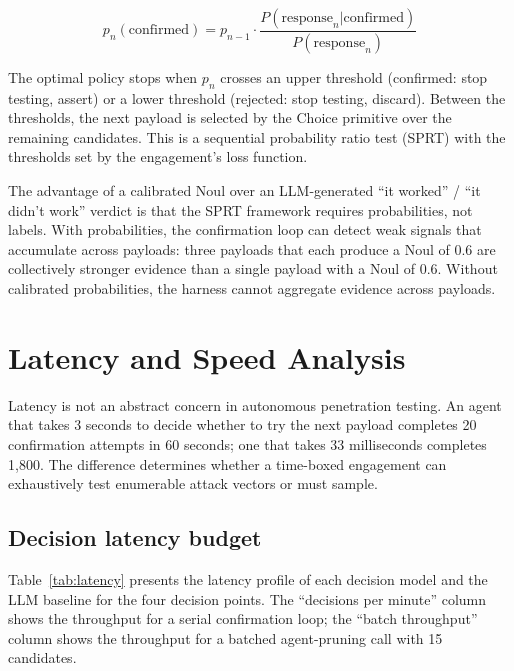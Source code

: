 \documentclass[conference]{IEEEtran}
\begin{document}
\begin{equation}
p_n(\text{confirmed}) = p_{n-1} \cdot \frac{P(\text{response}_n | \text{confirmed})}{P(\text{response}_n)}
\end{equation}

The optimal policy stops when $p_n$ crosses an upper threshold (confirmed: stop testing, assert) or a lower threshold (rejected: stop testing, discard). Between the thresholds, the next payload is selected by the Choice primitive over the remaining candidates. This is a sequential probability ratio test (SPRT) with the thresholds set by the engagement's loss function.

The advantage of a calibrated Noul over an LLM-generated ``it worked'' / ``it didn't work'' verdict is that the SPRT framework requires probabilities, not labels. With probabilities, the confirmation loop can detect weak signals that accumulate across payloads: three payloads that each produce a Noul of 0.6 are collectively stronger evidence than a single payload with a Noul of 0.6. Without calibrated probabilities, the harness cannot aggregate evidence across payloads.

\section{Latency and Speed Analysis}\label{sec:speed}

Latency is not an abstract concern in autonomous penetration testing. An agent that takes 3 seconds to decide whether to try the next payload completes 20 confirmation attempts in 60 seconds; one that takes 33 milliseconds completes 1,800. The difference determines whether a time-boxed engagement can exhaustively test enumerable attack vectors or must sample.

\subsection{Decision latency budget}

Table~\ref{tab:latency} presents the latency profile of each decision model and the LLM baseline for the four decision points. The ``decisions per minute'' column shows the throughput for a serial confirmation loop; the ``batch throughput'' column shows the throughput for a batched agent-pruning call with 15 candidates.
\end{document}
